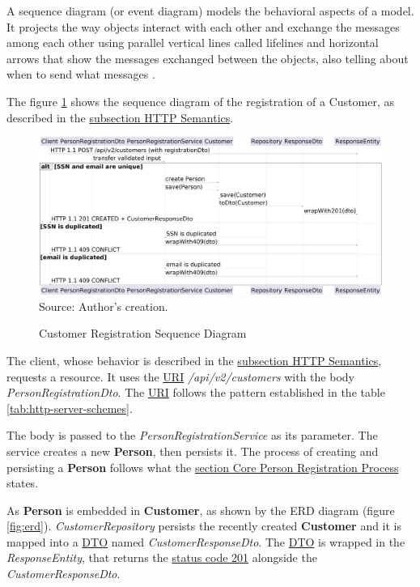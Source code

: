 A sequence diagram (or event diagram) models the behavioral aspects of a model. It projects the way objects interact with each other and exchange the messages among each other using parallel vertical lines called lifelines and horizontal arrows that show the messages exchanged between the objects, also telling about when to send what messages \cite{panigrahi2018}.

The figure \ref{fig:customer_registration_sequence_diagram} shows the sequence diagram of the registration of a Customer, as described in the \hyperref[subsection:http_semantics]{subsection HTTP Semantics}.

\begin{figure}[H]
	\centering
	\caption{Customer Registration Sequence Diagram}
	\includegraphics[width=1\linewidth]{figures/customer_registration_sequence_diagram.png}
	\\ \footnotesize Source: Author's creation.
	\label{fig:customer_registration_sequence_diagram}
\end{figure}

The client, whose behavior is described in the \hyperref[subsection:http_semantics]{subsection HTTP Semantics}, requests a resource. It uses the \hyperref[appendix:glossary]{URI} \textit{/api/v2/customers} with the body \textit{PersonRegistrationDto}. The \hyperref[appendix:glossary]{URI} follows the pattern established  in the table \ref{tab:http-server-schemes}.

The body is passed to the \textit{PersonRegistrationService} as its parameter. The service creates a new \textbf{Person}, then persists it.  The process of creating and persisting a \textbf{Person} follows what the \hyperref[core_person_registration_process]{section Core Person Registration Process} states.

As \textbf{Person} is embedded in \textbf{Customer}, as shown by the ERD diagram (figure \ref{fig:erd}). \textit{CustomerRepository} persists the recently created \textbf{Customer} and it is mapped into a \hyperref[appendix:glossary]{DTO} named \textit{CustomerResponseDto}. The \hyperref[appendix:glossary]{DTO} is wrapped in the \textit{ResponseEntity}, that returns the \hyperref[tab:summary_http_status_codes]{status code 201} alongside the \textit{CustomerResponseDto}.

